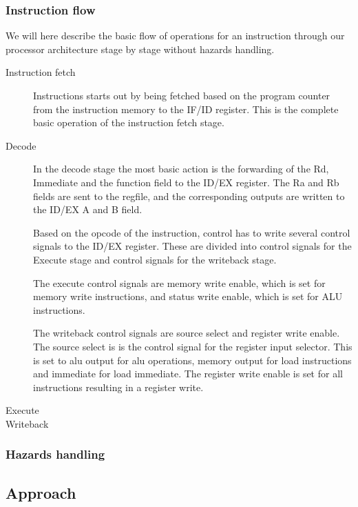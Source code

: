 \documentclass[11pt]{report}
\begin{document}
\subsubsection*{Instruction flow}
We will here describe the basic flow of operations for an instruction
through our processor architecture stage by stage without hazards handling.
\begin{description}

\item[Instruction fetch]
Instructions starts out by being fetched based on the program counter from the
instruction memory to the IF/ID register. This is the complete basic operation of the 
instruction fetch stage.
\item[Decode]
In the decode stage the most basic action is the forwarding of the Rd, Immediate and
the function field to the ID/EX register. The Ra and Rb fields are sent to the regfile, 
and the corresponding outputs are written to the ID/EX A and B field. 

Based on the opcode of the instruction, control has to write several control signals 
to the ID/EX register. These are divided into control signals for the Execute stage
and control signals for the writeback stage.

The execute control signals are memory write enable, which is set for memory write instructions,
and status write enable, which is set for ALU instructions.

The writeback control signals are source select and register write enable. 
The source select is is the control signal for the register input selector. 
This is set to alu output for alu operations, memory output 
for load instructions and immediate for load immediate. The register write enable is set for all instructions
resulting in a register write.

\item[Execute]
\item[Writeback]

\end{description}

\subsubsection{Hazards handling}

\subsection*{Approach}

\end{document}
